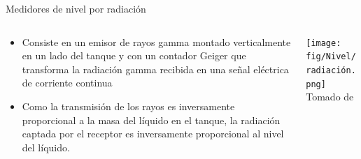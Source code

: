 \documentclass[aspectratio=169]{beamer}
\begin{document}
\begin{frame}{Medidores de nivel por radiación}
    \begin{columns}[c, onlytextwidth]
        \begin{column}{0.5\textwidth}
                
            \begin{itemize}
                \item Consiste en un emisor de rayos gamma montado verticalmente en un lado del tanque y con un contador Geiger que transforma la radiación gamma recibida en una señal eléctrica de corriente continua
                \item Como la transmisión de los rayos es inversamente proporcional a la masa del líquido en el tanque, la radiación captada por el receptor es inversamente proporcional al nivel del líquido.
                
            \end{itemize}
                
        \end{column}
        \begin{column}{0.50\textwidth}
        \centering
            \texttt{[image: fig/Nivel/radiación.png]}\\
            \tiny{Tomado de \cite{sole2005instrumentacion}}
        \end{column}
    \end{columns}
\end{frame}
\end{document}
